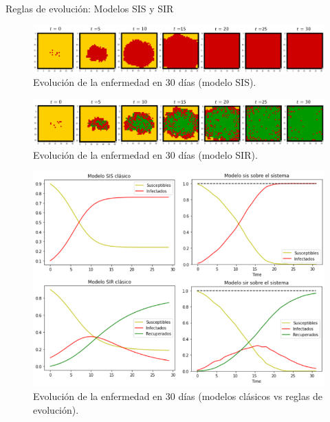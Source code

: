 \documentclass[9pt]{beamer}
\begin{document}
\begin{frame}{Reglas de evolución: Modelos SIS y SIR}
\begin{minipage}{0.5\textwidth}
\begin{figure}[h]
  \centering
 \includegraphics[width=1\textwidth]{Imagenes/sisEn30.PNG}
 \caption{Evolución de la enfermedad en 30 días (modelo SIS).}
 \label{fig:sisEn30}
\end{figure}
\begin{figure}[h]
  \centering
 \includegraphics[width=1\textwidth]{Imagenes/sirEn30.PNG}
 \caption{Evolución de la enfermedad en 30 días (modelo SIR).}
 \label{fig:sirEn30}
\end{figure}
\end{minipage}
\hfill
\begin{minipage}{0.45\textwidth}
\begin{figure}[h]
  \centering
    \includegraphics[width=1\textwidth]{Imagenes/solucionesSISySIR1.PNG}
    \caption{Evolución de la enfermedad en 30 días (modelos clásicos vs reglas de evolución).}
    \label{fig:sirEn30}
\end{figure}
\end{minipage}
\end{frame}
\end{document}
